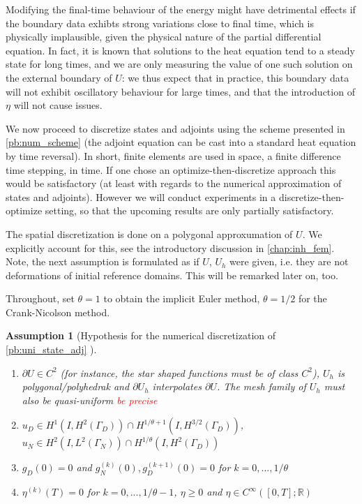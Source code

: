 \documentclass[english,a4paper,9pt,oneside]{scrbook}	%
\theoremstyle{break}
\newtheorem{ass}[equation]{Assumption}
\theoremstyle{remark}
\newcommand{\mR}{\mathbb{R}}
\begin{document}
Modifying the final-time behaviour of the energy might have detrimental effects if the boundary data exhibts strong variations close to final time, which is physically implausible, given the physical nature of the partial differential equation. In fact, it is known that solutions to the heat equation tend to a steady state for long times, and we are only measuring the value of one such solution on the external boundary of $U$: we thus expect that in practice, this boundary data will not exhibit oscillatory behaviour for large times, and that the introduction of $\eta$ will not cause issues.

We now proceed to discretize states and adjoints using the scheme presented in \cref{pb:num_scheme} (the adjoint equation can be cast into a standard heat equation by time reversal). In short, finite elements are used in space, a finite difference time stepping, in time. If one chose an optimize-then-discretize approach this would be satisfactory (at least with regards to the numerical approximation of states and adjoints). However we will conduct experiments in a discretize-then-optimize setting, so that the upcoming results are only partially satisfactory.

The spatial discretization is done on a polygonal approxumation of $U$. We explicitly account for this, see the introductory discussion in \cref{chap:inh_fem}. Note, the next assumption is formulated as if $U$, $U_h$ were given, i.e. they are not deformations of initial reference domains. This will be remarked later on, too. 

Throughout, set $\theta=1$ to obtain the implicit Euler method, $\theta=1/2$ for the Crank-Nicolson method.

\begin{ass}[Hypothesis for the numerical discretization of \cref{pb:uni_state_adj} ]
\label{ass:num_discr_shopt}
\textcolor{white}{ }
\begin{enumerate}
	\item $\partial U \in C^2$ (for instance, the star shaped functions must be of class $C^2$), $U_h$ is polygonal/polyhedrak and $\partial U_h$ interpolates $\partial U$. The mesh family of $U_h$ must also be quasi-uniform \textcolor{red}{be precise}
	\item $u_D \in H^1(I, H^{2}(\Gamma_D)) \cap H^{1/\theta+1}(I,H^{3/2}(\Gamma_D))$, $u_N \in H^2(I,L^2(\Gamma_N)) \cap H^{1/\theta}(I, H^2(\Gamma_D))$
	\item $g_D(0)=0$ and $g_N^{(k)}(0), g_D^{(k+1)}(0)  = 0$ for $k=0,..., 1/\theta$
	\item $\eta^{(k)}(T)  = 0$ for $k=0,..., 1/\theta-1$, $\eta \geq 0$ and $\eta \in C^{\infty}([0,T];\mR)$
\end{enumerate}

\end{ass}
\end{document}
